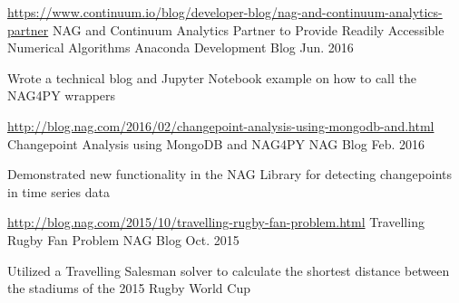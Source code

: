 

\begin{cventries}

  \cventry
    {\href{https://www.continuum.io/blog/developer-blog/nag-and-continuum-analytics-partner}{https://www.continuum.io/blog/developer-blog/nag-and-continuum-analytics-partner}} %
    {NAG and Continuum Analytics Partner to Provide Readily Accessible Numerical Algorithms } %
    {Anaconda Development Blog} %
    {Jun. 2016} %
    {
      \begin{cvitems} %
        \item {Wrote a technical blog and Jupyter Notebook example on how to call the NAG4PY wrappers}
      \end{cvitems}
    }
    
  \cventry
    {\href{http://blog.nag.com/2016/02/changepoint-analysis-using-mongodb-and.html}{http://blog.nag.com/2016/02/changepoint-analysis-using-mongodb-and.html}} %
    {Changepoint Analysis using MongoDB and NAG4PY} %
    {NAG Blog} %
    {Feb. 2016} %
    {
      \begin{cvitems} %
        \item {Demonstrated new functionality in the NAG Library for detecting changepoints in time series data }
      \end{cvitems}
    }
    
  \cventry
    {\href{http://blog.nag.com/2015/10/travelling-rugby-fan-problem.html}{http://blog.nag.com/2015/10/travelling-rugby-fan-problem.html}} %
    {Travelling Rugby Fan Problem} %
    {NAG Blog} %
    {Oct. 2015} %
    {
      \begin{cvitems} %
        \item {Utilized a Travelling Salesman solver to calculate the shortest distance between the stadiums of the 2015 Rugby World Cup}
      \end{cvitems}
    }
      
\end{cventries}
